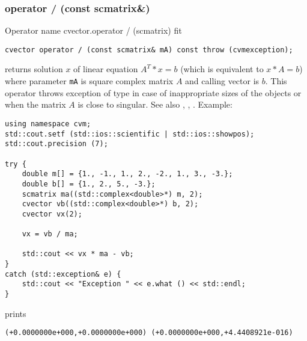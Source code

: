 \subsubsection{operator / (const scmatrix\&)}
Operator%
\pdfdest name {cvector.operator / (scmatrix)} fit
\begin{verbatim}
cvector operator / (const scmatrix& mA) const throw (cvmexception);
\end{verbatim}
returns solution $x$ of linear equation
$A^T*x=b$ (which is equivalent to $x*A=b$) 
where parameter \verb"mA" is  square complex matrix $A$
and calling vector is $b$.
This operator throws exception 
of type 
in case of inappropriate sizes
of the objects or when the matrix $A$ is close to singular.
See also , , .
Example:
\begin{Verbatim}
using namespace cvm;
std::cout.setf (std::ios::scientific | std::ios::showpos);
std::cout.precision (7);

try {
    double m[] = {1., -1., 1., 2., -2., 1., 3., -3.};
    double b[] = {1., 2., 5., -3.};
    scmatrix ma((std::complex<double>*) m, 2);
    cvector vb((std::complex<double>*) b, 2);
    cvector vx(2);

    vx = vb / ma;

    std::cout << vx * ma - vb;
}
catch (std::exception& e) {
    std::cout << "Exception " << e.what () << std::endl;
}
\end{Verbatim}
prints
\begin{Verbatim}
(+0.0000000e+000,+0.0000000e+000) (+0.0000000e+000,+4.4408921e-016)
\end{Verbatim}
\newpage


